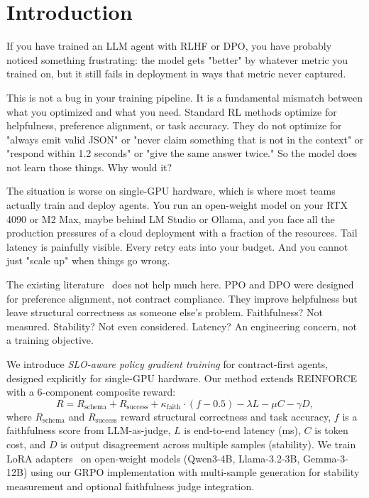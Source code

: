 \documentclass[11pt]{article}
\begin{document}
\section{Introduction}

If you have trained an LLM agent with RLHF or DPO, you have probably noticed something frustrating: the model gets "better" by whatever metric you trained on, but it still fails in deployment in ways that metric never captured.

This is not a bug in your training pipeline.
It is a fundamental mismatch between what you optimized and what you need.
Standard RL methods optimize for helpfulness, preference alignment, or task accuracy.
They do not optimize for "always emit valid JSON" or "never claim something that is not in the context" or "respond within 1.2 seconds" or "give the same answer twice."
So the model does not learn those things.
Why would it?

The situation is worse on single-GPU hardware, which is where most teams actually train and deploy agents.
You run an open-weight model on your RTX 4090 or M2 Max, maybe behind LM Studio or Ollama, and you face all the production pressures of a cloud deployment with a fraction of the resources.
Tail latency is painfully visible.
Every retry eats into your budget.
And you cannot just "scale up" when things go wrong.

The existing literature~\citep{schulman2017ppo,ouyang2022rlhf,rafailov2023dpo} does not help much here.
PPO and DPO were designed for preference alignment, not contract compliance.
They improve helpfulness but leave structural correctness as someone else's problem.
Faithfulness?
Not measured.
Stability?
Not even considered.
Latency?
An engineering concern, not a training objective.

We introduce \emph{SLO-aware policy gradient training} for contract-first agents, designed explicitly for single-GPU hardware.
Our method extends REINFORCE~\citep{williams1992reinforce} with a 6-component composite reward:
\begin{equation}
R = R_{\text{schema}} + R_{\text{success}} + \kappa_{\text{faith}} \cdot (f - 0.5) - \lambda L - \mu C - \gamma D,
\end{equation}
where $R_{\text{schema}}$ and $R_{\text{success}}$ reward structural correctness and task accuracy,
$f$ is a faithfulness score from LLM-as-judge,
$L$ is end-to-end latency (ms), $C$ is token cost, and $D$ is output disagreement across multiple samples (stability).
We train LoRA adapters~\citep{hu2021lora,dettmers2023qlora} on open-weight models (Qwen3-4B, Llama-3.2-3B, Gemma-3-12B) using our GRPO implementation with multi-sample generation for stability measurement and optional faithfulness judge integration.
\end{document}
